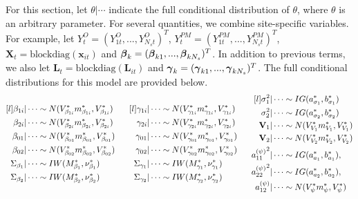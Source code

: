 \documentclass[alpha-refs]{wiley-article}
\newcommand{\bbeta}{ \mbox{\boldmath $ \beta $} }
\newcommand{\bgamma}{ \mbox{\boldmath $\gamma$} }
\newcommand{\bL}{\textbf{L}}
\newcommand{\bV}{\textbf{V}}
\newcommand{\bx}{\textbf{x}}
\newcommand{\bX}{\textbf{X}}
\begin{document}
For this section, let $\theta | \cdots$ indicate the full conditional distribution of $\theta$, where $\theta$ is an arbitrary parameter. For several quantities, we combine site-specific variables. For example, let $Y_t^O = (Y_{1t}^O,...,Y_{N_s t}^O)^T$, $Y_t^{PM} = (Y_{1t}^{PM},...,Y_{N_s t}^{PM})^T$, $\bX_t = \text{blockdiag}(\bx_{it} )$ and $\bbeta_k = (\bbeta_{k1} ,...,\bbeta_{k N_s})^T$. In addition to previous terms, we also let $\bL_t = \text{blockdiag}(\bL_{it})$ and $\bgamma_k = (\bgamma_{k1} ,...,\bgamma_{k N_s})^T$. The full conditional distributions for this model are provided below.
\begin{equation*}
\begin{aligned}[l]
\beta_{1i} | \cdots &\sim N(V_{\beta_{1i} }^* m_{\beta_{1i} }^* , V_{\beta_{1i} }^*) \\
\beta_{2i} | \cdots &\sim N(V_{\beta_{2i} }^* m_{\beta_{2i} }^* , V_{\beta_{2i} }^*) \\
\beta_{01} | \cdots &\sim N(V_{\beta_{01} }^* m_{\beta_{01} }^* , V_{\beta_{01} }^*) \\
\beta_{02} | \cdots &\sim N(V_{\beta_{02} }^* m_{\beta_{02} }^* , V_{\beta_{02} }^*) \\
\Sigma_{\beta_{1}} | \cdots &\sim IW(M_{\beta_{1}}^*,\nu^*_{\beta_{1}}) \\
\Sigma_{\beta_{2}}  | \cdots &\sim IW(M_{\beta_{2}}^*,\nu_{\beta_{2}}^*)
\end{aligned}
\hspace{6mm}
\begin{aligned}[l]
\gamma_{1i} | \cdots &\sim N(V_{\gamma_{1i} }^* m_{\gamma_{1i} }^* , V_{\gamma_{1i} }^*) \\
\gamma_{2i} | \cdots &\sim N(V_{\gamma_{2i} }^* m_{\gamma_{2i} }^* , V_{\gamma_{2i} }^*) \\
\gamma_{01} | \cdots &\sim N(V_{\gamma_{01} }^* m_{\gamma_{01} }^* , V_{\gamma_{01} }^*) \\
\gamma_{02} | \cdots &\sim N(V_{\gamma_{02} }^* m_{\gamma_{02} }^* , V_{\gamma_{02} }^*) \\
\Sigma_{\gamma_{1}} | \cdots &\sim IW(M_{\gamma_1}^*,\nu^*_{\gamma_1}) \\
\Sigma_{\gamma_{2}}  | \cdots &\sim IW(M_{\gamma_2}^*,\nu_{\gamma_2}^*)
\end{aligned}
\hspace{6mm}
\begin{aligned}[l]
\sigma^2_1 | \cdots &\sim IG(a^*_{\sigma_1},b^*_{\sigma_1}) \\
\sigma^2_2 | \cdots &\sim IG(a^*_{\sigma_2},b^*_{\sigma_2}) \\
\bV_1 | \cdots &\sim N(V_{V_1}^* m_{V_1}^* , V_{V_1}^*) \\
\bV_2 | \cdots &\sim N(V_{V_2}^* m_{V_2}^* , V_{V_2}^*) \\
{a^{(\psi)}_{11}}^2  | \cdots &\sim IG(a_{a_1}^*,b_{a_1}^*), \\
{a^{(\psi)}_{22}}^2 | \cdots   &\sim IG(a_{a_2}^*,b_{a_2}^*), \\
a^{(\psi)}_{12} | \cdots &\sim N(V_{\psi}^* m_{\psi}^* , V_{\psi}^*)
\end{aligned}
\end{equation*}
\end{document}
